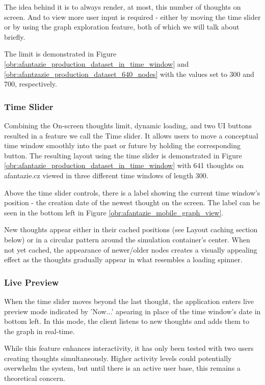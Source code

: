 The idea behind it is to always render, at most, this number of thoughts on screen.
And to view more user input is required - either by moving the time slider or by using the graph exploration feature, both of which we will talk about briefly.

The limit is demonstrated in Figure \ref{obr:afantazie_production_dataset_in_time_window} and \ref{obr:afantzazie_production_dataset_640_nodes} with the values set to 300 and 700, respectively.

\subsubsection*{Time Slider}
Combining the On-screen thoughts limit, dynamic loading, and two UI buttons resulted in a feature we call the Time slider.
It allows users to move a conceptual time window smoothly into the past or future by holding the corresponding button.
The resulting layout using the time slider is demonstrated in Figure \ref{obr:afantazie_production_dataset_in_time_window}
with 641 thoughts on afantazie.cz viewed in three different time windows of length 300.

Above the time slider controls, there is a label showing the current time window's position - the creation date of the newest thought on the screen.
The label can be seen in the bottom left in Figure \ref{obr:afantazie_mobile_graph_view}.

New thoughts appear either in their cached positions (see Layout caching section below) or in a circular pattern around the simulation container's center.
When not yet cached, the appearance of newer/older nodes creates a visually appealing effect as the thoughts gradually appear in what resembles a loading spinner.

\subsubsection*{Live Preview}
When the time slider moves beyond the last thought, the application enters live preview mode indicated by 'Now...' apearing in place of the time window's date in bottom left.
In this mode, the client listens to new thoughts and adds them to the graph in real-time.

While this feature enhances interactivity, it has only been tested with two users creating thoughts simultaneously.
Higher activity levels could potentially overwhelm the system, but until there is an active user base, this remains
a theoretical concern.

